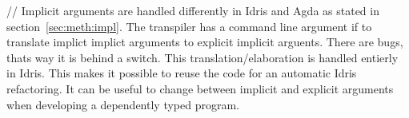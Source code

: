 
//
Implicit arguments are handled differently in Idris and Agda as
stated in section~\ref{sec:meth:impl}. The transpiler has a command line
argument if to translate implict implict arguments to explicit implicit
arguents. There are bugs, thats way it is behind a switch. This
translation/elaboration is handled entierly in Idris. This makes it possible to
reuse the code for an automatic Idris refactoring.  It can be useful to change
between implicit and explicit arguments when developing a dependently typed
program.






